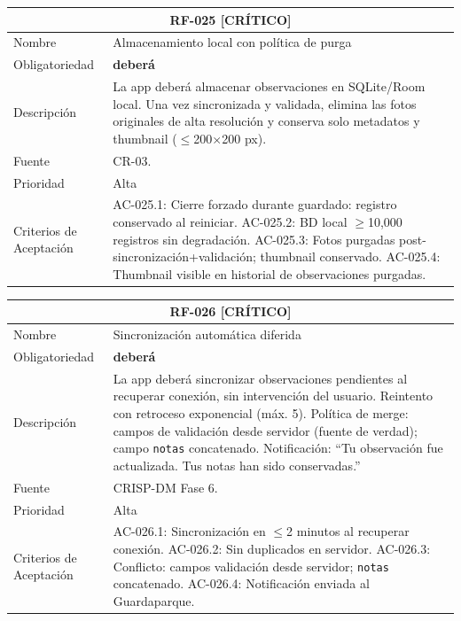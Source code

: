 \documentclass[12pt, a4paper]{article}
\newcommand{\criticomark}{\textcolor{criticolor}{\textbf{[CR\'ITICO]}}}
\begin{document}
\begin{longtable}{|p{3cm}|p{11.5cm}|}
\hline
\multicolumn{2}{|c|}{\textbf{RF-025} \criticomark} \\
\hline
Nombre & Almacenamiento local con pol\'itica de purga \\
\hline
Obligatoriedad & \textbf{deber\'a} \\
\hline
Descripci\'on & La app deber\'a almacenar observaciones en SQLite/Room local. Una vez sincronizada y validada, elimina las fotos originales de alta resoluci\'on y conserva solo metadatos y thumbnail ($\leq$200$\times$200 px). \\
\hline
Fuente & CR-03. \\
\hline
Prioridad & Alta \\
\hline
Criterios de Aceptaci\'on &
AC-025.1: Cierre forzado durante guardado: registro conservado al reiniciar. \newline
AC-025.2: BD local $\geq$10,000 registros sin degradaci\'on. \newline
AC-025.3: Fotos purgadas post-sincronizaci\'on+validaci\'on; thumbnail conservado. \newline
AC-025.4: Thumbnail visible en historial de observaciones purgadas. \\
\hline
\end{longtable}

\begin{longtable}{|p{3cm}|p{11.5cm}|}
\hline
\multicolumn{2}{|c|}{\textbf{RF-026} \criticomark} \\
\hline
Nombre & Sincronizaci\'on autom\'atica diferida \\
\hline
Obligatoriedad & \textbf{deber\'a} \\
\hline
Descripci\'on & La app deber\'a sincronizar observaciones pendientes al recuperar conexi\'on, sin intervenci\'on del usuario. Reintento con retroceso exponencial (m\'ax. 5). Pol\'itica de merge: campos de validaci\'on desde servidor (fuente de verdad); campo \texttt{notas} concatenado. Notificaci\'on: ``Tu observaci\'on fue actualizada. Tus notas han sido conservadas.'' \\
\hline
Fuente & CRISP-DM Fase 6. \\
\hline
Prioridad & Alta \\
\hline
Criterios de Aceptaci\'on &
AC-026.1: Sincronizaci\'on en $\leq$2 minutos al recuperar conexi\'on. \newline
AC-026.2: Sin duplicados en servidor. \newline
AC-026.3: Conflicto: campos validaci\'on desde servidor; \texttt{notas} concatenado. \newline
AC-026.4: Notificaci\'on enviada al Guardaparque. \\
\hline
\end{longtable}
\end{document}
